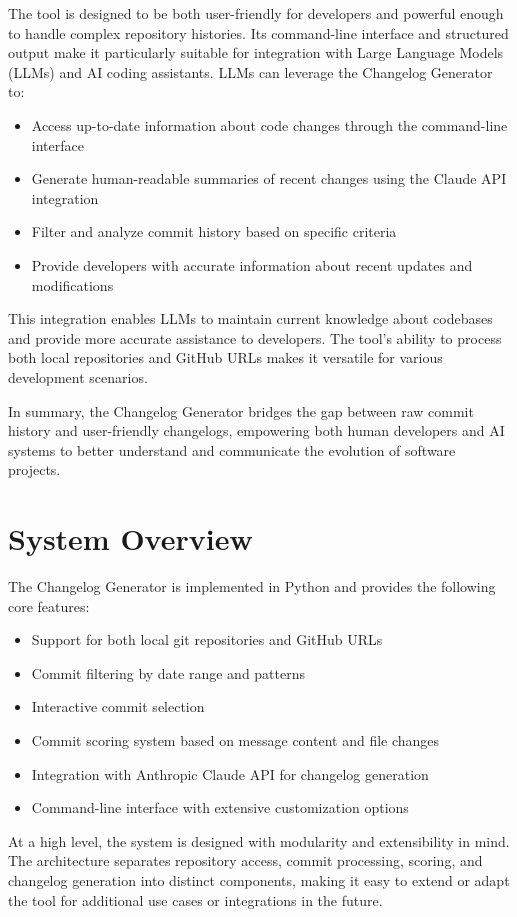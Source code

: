 \documentclass[sigconf]{acmart}
\begin{document}
The tool is designed to be both user-friendly for developers and powerful enough to handle complex repository histories. Its command-line interface and structured output make it particularly suitable for integration with Large Language Models (LLMs) and AI coding assistants. LLMs can leverage the Changelog Generator to:
\begin{itemize}
    \item Access up-to-date information about code changes through the command-line interface
    \item Generate human-readable summaries of recent changes using the Claude API integration
    \item Filter and analyze commit history based on specific criteria
    \item Provide developers with accurate information about recent updates and modifications
\end{itemize}

This integration enables LLMs to maintain current knowledge about codebases and provide more accurate assistance to developers. The tool's ability to process both local repositories and GitHub URLs makes it versatile for various development scenarios.

In summary, the Changelog Generator bridges the gap between raw commit history and user-friendly changelogs, empowering both human developers and AI systems to better understand and communicate the evolution of software projects.


\section{System Overview}
The Changelog Generator is implemented in Python and provides the following core features:
\begin{itemize}
    \item Support for both local git repositories and GitHub URLs
    \item Commit filtering by date range and patterns
    \item Interactive commit selection
    \item Commit scoring system based on message content and file changes
    \item Integration with Anthropic Claude API for changelog generation
    \item Command-line interface with extensive customization options
\end{itemize}

At a high level, the system is designed with modularity and extensibility in mind. The architecture separates repository access, commit processing, scoring, and changelog generation into distinct components, making it easy to extend or adapt the tool for additional use cases or integrations in the future.
\end{document}
